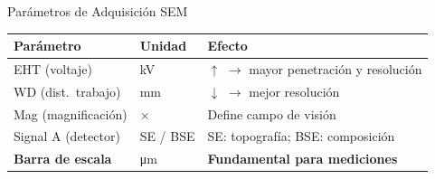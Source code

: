 \documentclass[aspectratio=169,12pt]{beamer}
\begin{document}
\begin{frame}{Parámetros de Adquisición SEM}
	\centering
	\small
	\begin{tabular}{lll}
		\toprule
		\textbf{Parámetro}       & \textbf{Unidad}
		                         & \textbf{Efecto}                                 \\
		\midrule
		EHT (voltaje)            & \si{\kilo\volt}
		                         & $\uparrow$ $\to$ mayor penetración y resolución \\
		WD (dist.\ trabajo)      & \si{\mm}
		                         & $\downarrow$ $\to$ mejor resolución             \\
		Mag (magnificación)      & $\times$
		                         & Define campo de visión                          \\
		Signal A (detector)      & SE / BSE
		                         & SE: topografía; BSE: composición                \\
		\rowcolor{aeroyellow!20}
		\textbf{Barra de escala} & \si{\micro\m}
		                         & \textbf{Fundamental para mediciones}            \\
		\bottomrule
	\end{tabular}

	\vspace{0.5cm}
\end{frame}
\end{document}
